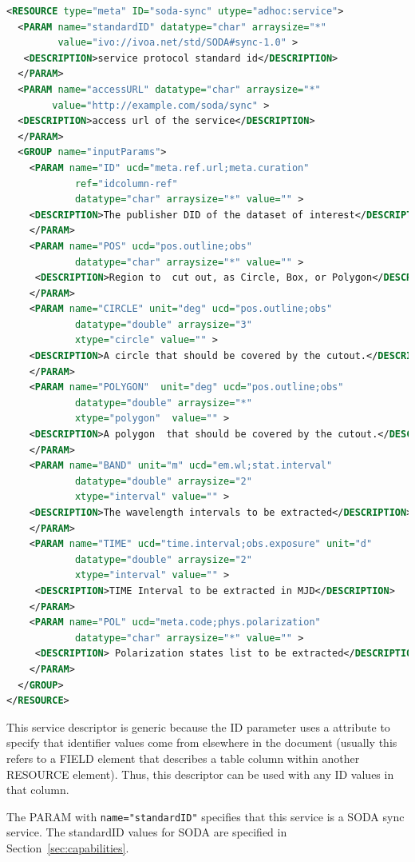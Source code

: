 \documentclass[11pt,a4paper]{ivoa}
\begin{document}
\begin{lstlisting}[language=XML]
<RESOURCE type="meta" ID="soda-sync" utype="adhoc:service">
  <PARAM name="standardID" datatype="char" arraysize="*" 
         value="ivo://ivoa.net/std/SODA#sync-1.0" >
   <DESCRIPTION>service protocol standard id</DESCRIPTION>
  </PARAM>
  <PARAM name="accessURL" datatype="char" arraysize="*" 
        value="http://example.com/soda/sync" >
  <DESCRIPTION>access url of the service</DESCRIPTION>
  </PARAM>
  <GROUP name="inputParams">
    <PARAM name="ID" ucd="meta.ref.url;meta.curation" 
            ref="idcolumn-ref" 
            datatype="char" arraysize="*" value="" >
    <DESCRIPTION>The publisher DID of the dataset of interest</DESCRIPTION>
    </PARAM>
    <PARAM name="POS" ucd="pos.outline;obs" 
            datatype="char" arraysize="*" value="" >
     <DESCRIPTION>Region to  cut out, as Circle, Box, or Polygon</DESCRIPTION>
    </PARAM>
    <PARAM name="CIRCLE" unit="deg" ucd="pos.outline;obs" 
            datatype="double" arraysize="3" 
            xtype="circle" value="" >
    <DESCRIPTION>A circle that should be covered by the cutout.</DESCRIPTION>
    </PARAM>
    <PARAM name="POLYGON"  unit="deg" ucd="pos.outline;obs"
            datatype="double" arraysize="*" 
            xtype="polygon"  value="" >
    <DESCRIPTION>A polygon  that should be covered by the cutout.</DESCRIPTION>
    </PARAM>
    <PARAM name="BAND" unit="m" ucd="em.wl;stat.interval" 
            datatype="double" arraysize="2" 
            xtype="interval" value="" >
    <DESCRIPTION>The wavelength intervals to be extracted</DESCRIPTION>
    </PARAM> 
    <PARAM name="TIME" ucd="time.interval;obs.exposure" unit="d" 
            datatype="double" arraysize="2" 
            xtype="interval" value="" >
     <DESCRIPTION>TIME Interval to be extracted in MJD</DESCRIPTION>
    </PARAM>
    <PARAM name="POL" ucd="meta.code;phys.polarization" 
            datatype="char" arraysize="*" value="" >
     <DESCRIPTION> Polarization states list to be extracted</DESCRIPTION>
    </PARAM>
  </GROUP>
</RESOURCE>
\end{lstlisting}

This service descriptor is generic because the ID parameter uses a
 attribute to specify that identifier values come from
elsewhere in the document (usually this refers to a FIELD element that
describes a table column within another RESOURCE element). Thus, this
descriptor can be used with any ID values in that column.

The PARAM with \verb|name="standardID"| specifies that this service is
a SODA sync service. The standardID values for SODA are specified in
Section~\ref{sec:capabilities}. 
\end{document}
